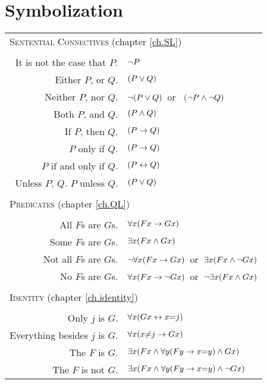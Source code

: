 
\section*{Symbolization}
\label{app.symbolization}
\begin{tabular*}{\textwidth}{rl}
\multicolumn{2}{l}{\textsc{Sentential Connectives} (chapter \ref{ch.SL})}\\ \\
It is not the case that $P$. & $\neg P$\\
Either $P$, or $Q$. & $(P \vee Q)$\\
Neither $P$, nor $Q$. & $\neg(P \vee Q)$\ or \ $(\neg P \wedge \neg Q)$\\
Both $P$, and $Q$. & $(P \wedge Q)$\\
If $P$, then $Q$. & $(P \to Q)$\\
$P$ only if $Q$. & $(P \to Q)$\\
$P$ if and only if $Q$. & $(P \leftrightarrow Q)$\\
Unless $P$, $Q$. $P$ unless $Q$. & $(P \vee Q)$\\
\\
\multicolumn{2}{l}{\label{SymbolizingPredicates}\textsc{Predicates} (chapter \ref{ch.QL})}\\ \\
All $F$s are $G$s. & $\forall x(Fx \to Gx)$\\
Some $F$s are $G$s. & $\exists x(Fx \wedge Gx)$\\
Not all $F$s are $G$s. & $\neg\forall x(Fx \to Gx)$\ or\ $\exists x(Fx \wedge \neg Gx)$\\
No $F$s are $G$s. & $\forall x(Fx \to\neg Gx)$\ or\ $\neg\exists x(Fx \wedge Gx)$\\
\\
\multicolumn{2}{l}{\textsc{Identity} (chapter \ref{ch.identity})}\\ \\
Only $j$ is $G$. & $\forall x(Gx \leftrightarrow x{=}j)$\\
Everything besides $j$ is $G$. & $\forall x(x {\neq} j \to Gx)$\\
The $F$ is $G$. & $\exists x(Fx \wedge \forall y(Fy \to x{=}y) \wedge Gx)$\\
The $F$ is not $G$. & $\exists x(Fx \wedge \forall y(Fy \to x{=}y) \wedge \neg Gx)$\\
%
\end{tabular*}


